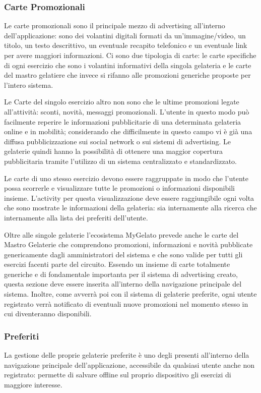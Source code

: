 \subsubsection{Carte Promozionali}
Le carte promozionali sono il principale mezzo di advertising all'interno dell'applicazione: sono dei volantini digitali formati da un'immagine/video, un titolo, un testo descrittivo, un eventuale recapito telefonico e un eventuale link per avere maggiori informazioni.
Ci sono due tipologia di carte: le carte specifiche di ogni esercizio che sono i volantini informativi della singola gelateria e le carte del mastro gelatiere che invece si rifanno alle promozioni generiche proposte per l'intero sistema.

Le Carte del singolo esercizio altro non sono che le ultime promozioni legate all'attività: sconti, novità, messaggi promozionali.
L'utente in questo modo può facilmente reperire le informazioni pubblicitarie di una determinata gelateria online e in mobilità; considerando che difficilmente in questo campo vi è già una diffusa pubblicizzazione sui social network o sui sistemi di advertising.
Le gelaterie quindi hanno la possibilità di ottenere una maggior copertura pubblicitaria tramite l'utilizzo di un sistema centralizzato e standardizzato.

Le carte di uno stesso esercizio devono essere raggruppate in modo che l'utente possa scorrerle e visualizzare tutte le promozioni o informazioni disponibili insieme.
L'activity per questa visualizzazione deve essere raggiungibile ogni volta che sono mostrate le informazioni della gelateria: sia internamente alla ricerca che internamente alla lista dei preferiti dell'utente.

Oltre alle singole gelaterie l'ecosistema MyGelato prevede anche le carte del Mastro Gelaterie che comprendono promozioni, informazioni e novità pubblicate genericamente dagli amministratori del sistema e che sono valide per tutti gli esercizi facenti parte del circuito.
Essendo un insieme di carte totalmente generiche e di fondamentale importanta per il sistema di advertising creato, questa sezione deve essere inserita all'interno della navigazione principale del sistema.
Inoltre, come avverrà poi con il sistema di gelaterie preferite, ogni utente registrato verrà notificato di eventuali nuove promozioni nel momento stesso in cui diventeranno disponibili.

\subsubsection{Preferiti}
La gestione delle proprie gelaterie preferite è uno degli presenti all'interno della navigazione principale dell'applicazione, accessibile da qualsiasi utente anche non registrato: permette di salvare offline sul proprio dispositivo gli esercizi di maggiore interesse.

